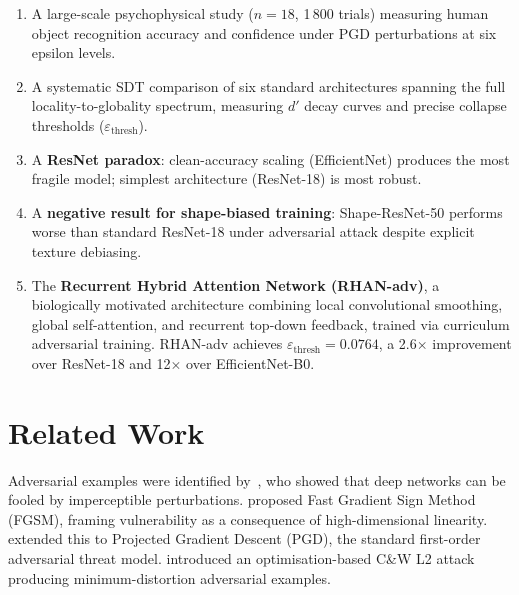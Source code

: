 \documentclass[12pt,a4paper]{article}
\begin{document}
\begin{enumerate}[leftmargin=1.5em]
  \item A large-scale psychophysical study ($n{=}18$, 1\,800 trials)
        measuring human object recognition accuracy and confidence under
        PGD perturbations at six epsilon levels.
  \item A systematic SDT comparison of six standard architectures spanning
        the full locality-to-globality spectrum, measuring $d'$ decay curves
        and precise collapse thresholds ($\varepsilon_{\text{thresh}}$).
  \item A \textbf{ResNet paradox}: clean-accuracy scaling (EfficientNet)
        produces the most fragile model; simplest architecture (ResNet-18)
        is most robust.
  \item A \textbf{negative result for shape-biased training}: Shape-ResNet-50
        performs worse than standard ResNet-18 under adversarial attack despite
        explicit texture debiasing.
  \item The \textbf{Recurrent Hybrid Attention Network (RHAN-adv)},
        a biologically motivated architecture combining local convolutional
        smoothing, global self-attention, and recurrent top-down feedback,
        trained via curriculum adversarial training.
        RHAN-adv achieves $\varepsilon_{\text{thresh}}{=}0.0764$,
        a 2.6$\times$ improvement over ResNet-18 and
        12$\times$ over EfficientNet-B0.
\end{enumerate}

\section{Related Work}
\label{sec:related}

Adversarial examples were identified by~\citet{szegedy2013intriguing},
who showed that deep networks can be fooled by imperceptible perturbations.
\citet{goodfellow2015explaining} proposed Fast Gradient Sign Method (FGSM),
framing vulnerability as a consequence of high-dimensional linearity.
\citet{madry2018towards} extended this to Projected Gradient Descent (PGD),
the standard first-order adversarial threat model.
\citet{carlini2017towards} introduced an optimisation-based C\&W L2 attack
producing minimum-distortion adversarial examples.
\end{document}
